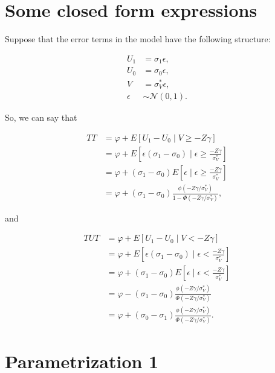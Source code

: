 \documentclass[9pt,twocolumn,twoside,]{pnas-new}
\begin{document}
\hypertarget{some-closed-form-expressions}{%
\section{Some closed form
expressions}\label{some-closed-form-expressions}}

Suppose that the error terms in the model have the following structure:

\begin{align*}
U_1 &= \sigma_1 \epsilon, \\
U_0 &= \sigma_0 \epsilon, \\
V &= \sigma^*_V \epsilon, \\
\epsilon &\sim \mathcal{N} (0, 1).
\end{align*}

So, we can say that

\begin{align*}
TT &= \varphi + E \left[ U_1 - U_0 \mid V \geq - Z \gamma \right] \\
&= \varphi + E \left[ \epsilon (\sigma_1 - \sigma_0) \mid \epsilon \geq \frac{- Z \gamma}{\sigma^*_V} \right] \\
&= \varphi + (\sigma_1 - \sigma_0) E \left[ \epsilon \mid \epsilon \geq \frac{- Z \gamma}{\sigma^*_V} \right] \\
&= \varphi + (\sigma_1 - \sigma_0) \frac{\phi \left( - Z \gamma / \sigma^*_V \right)}{1 - \Phi \left( - Z \gamma / \sigma^*_V \right) },
\end{align*}

and

\begin{align*}
TUT &= \varphi + E \left[ U_1 - U_0 \mid V < - Z \gamma \right] \\
&= \varphi + E \left[ \epsilon (\sigma_1 - \sigma_0) \mid \epsilon < \frac{- Z \gamma}{\sigma^*_V} \right] \\
&= \varphi + (\sigma_1 - \sigma_0) E \left[ \epsilon \mid \epsilon < \frac{- Z \gamma}{\sigma^*_V} \right] \\
&= \varphi - (\sigma_1 - \sigma_0) \frac{\phi \left( - Z \gamma / \sigma^*_V \right)}{\Phi \left( - Z \gamma / \sigma^*_V \right) } \\
&= \varphi + (\sigma_0 - \sigma_1) \frac{\phi \left( - Z \gamma / \sigma^*_V \right)}{\Phi \left( - Z \gamma / \sigma^*_V \right) }.
\end{align*}

\hypertarget{parametrization-1}{%
\section{Parametrization 1}\label{parametrization-1}}
\end{document}
